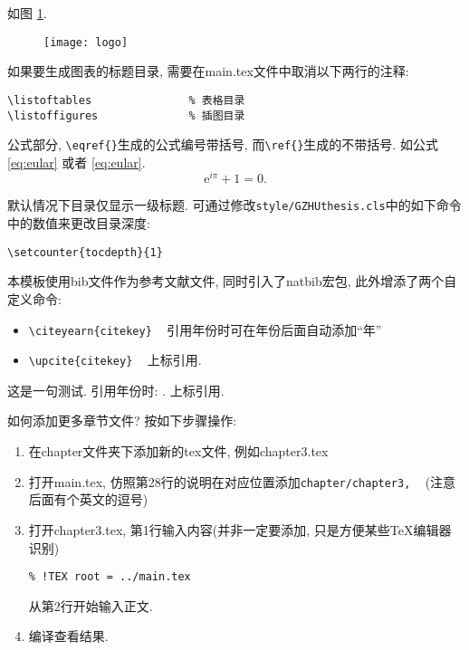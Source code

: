 如图 \ref{fig:logo}. 
\begin{figure}[h]
	\centering
	\texttt{[image: logo]}
	\label{fig:logo}
\end{figure}

如果要生成图表的标题目录, 需要在main.tex文件中取消以下两行的注释:
\begin{verbatim}
\listoftables               % 表格目录
\listoffigures              % 插图目录
\end{verbatim}

公式部分, \verb|\eqref{}|生成的公式编号带括号, 而\verb|\ref{}|生成的不带括号. 如公式 \ref{eq:eular} 或者 \eqref{eq:eular}.
\begin{equation}\label{eq:eular}
  \mathrm{e}^{i\pi}+1=0.
\end{equation}

默认情况下目录仅显示一级标题. 可通过修改\verb|style/GZHUthesis.cls|中的如下命令中的数值来更改目录深度:
\begin{verbatim}
\setcounter{tocdepth}{1} 
\end{verbatim}

本模板使用bib文件作为参考文献文件, 同时引入了natbib宏包, 此外增添了两个自定义命令:
\begin{itemize}
\item \verb|\citeyearn{citekey}|  ~  引用年份时可在年份后面自动添加``年''
\item \verb|\upcite{citekey}| ~ 上标引用.
\end{itemize}

这是一句测试\cite{Hazay_2010_Efficient}. 引用年份时: . 上标引用.

\begin{QandA}{如何添加更多章节文件?}
按如下步骤操作:
\begin{enumerate}
\item 在chapter文件夹下添加新的tex文件, 例如chapter3.tex
\item 打开main.tex, 仿照第28行的说明在对应位置添加\verb|chapter/chapter3,| ~ (注意后面有个英文的逗号)
\item 打开chapter3.tex, 第1行输入内容(并非一定要添加, 只是方便某些TeX编辑器识别)
\begin{verbatim}
% !TEX root = ../main.tex
\end{verbatim}
从第2行开始输入正文.
\item 编译查看结果.
\end{enumerate}
\end{QandA}

